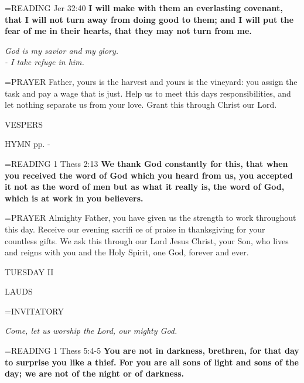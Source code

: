 \hangindent=\parindent \small{READING} Jer 32:40 \textbf{I will make with them an everlasting covenant, that I will not turn away from doing good to them; and I will put the fear of me in their hearts, that they may not turn from me.  }

\begin{center}
\textit{God is my savior and my glory.\\
- I take refuge in him.}
\end{center}

\hangindent=\parindent \small{PRAYER  Father, yours is the harvest and yours is the vineyard: you assign the task and pay a wage that is just. Help us to meet this days responsibilities, and let nothing separate us from your love. Grant this through Christ our Lord.}

\begin{flushleft}\normalsize VESPERS\\\end{flushleft}

HYMN pp. \pageref{ordinaryTime:fourthHymn} - \pageref{ordinaryTime:sixthHymn}

\hangindent=\parindent \small{READING} 1 Thess 2:13 \textbf{We thank God constantly for this, that when you received the word of God which you heard from us, you accepted it not as the word of men but as what it really is, the word of God, which is at work in you believers.\\}

\hangindent=\parindent \small{PRAYER  Almighty Father, you have given us the strength to work throughout this day. Receive our evening sacrifi ce of praise in thanksgiving for your countless gifts. We ask this through our Lord Jesus Christ, your Son, who lives and reigns with you and the Holy Spirit, one God, forever and ever.}

\begin{center}
\normalsize TUESDAY II
\end{center}

\begin{flushleft}\normalsize LAUDS\\\end{flushleft}

\hangindent=\parindent \small{INVITATORY}
\begin{center}
\textit{Come, let us worship the Lord, our mighty God.\\}
\end{center}

\hangindent=\parindent \small{READING} 1 Thess 5:4-5 \textbf{You are not in darkness, brethren, for that day to surprise you like a thief. For you are all sons of light and sons of the day; we are not of the night or of darkness.\\}

